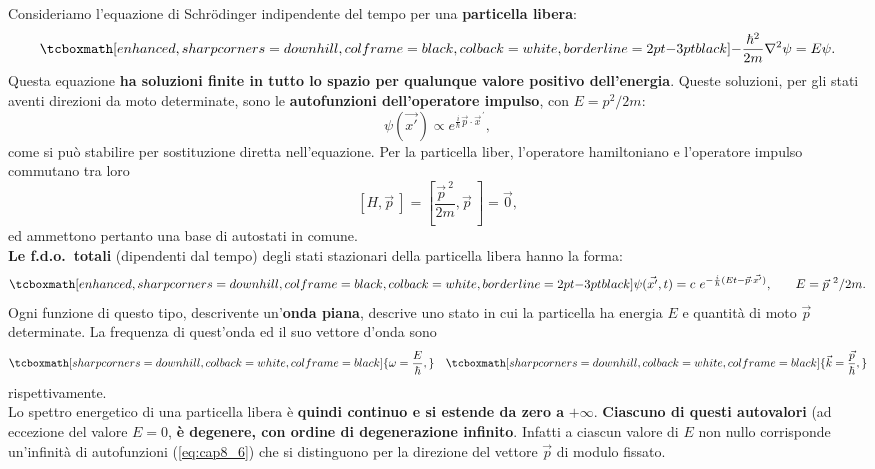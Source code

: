 Consideriamo l'equazione di Schr\"{o}dinger indipendente del tempo per una \textbf{particella libera}:
	\begin{equation}
		\tcboxmath[enhanced, sharp corners=downhill, colframe=black, colback=white, borderline={2pt}{-3pt}{black}]{
			-\frac{\hbar ^2}{2m}\nabla ^2 \psi = E\psi.
			}
	\end{equation}
Questa equazione \textbf{ha soluzioni finite in tutto lo spazio per qualunque valore positivo dell'energia}. Queste soluzioni, per gli stati aventi direzioni da moto determinate, sono le \textbf{autofunzioni dell'operatore impulso}, con $E= p^2/2m$:
	\begin{equation}
		\psi (\vec{x'}) \propto e ^{\frac{i}{\hbar}\vec{p}\cdot {\vec{x}}^{\, \prime}},
	\end{equation}
come si può stabilire per sostituzione diretta nell'equazione. Per la particella liber, l'operatore hamiltoniano e l'operatore impulso commutano tra loro
	\begin{equation}
		\left[ H, \vec{p}\ \right] = \left[ \frac{ {\vec{p}}^{\ 2}}{2m}, \vec{p}\ \right] =\vec{0},
	\end{equation}
ed ammettono pertanto una base di autostati in comune.\\
\textbf{Le f.d.o.~totali} (dipendenti dal tempo) degli stati stazionari della particella libera hanno la forma:
	\begin{equation}
		\tcboxmath[enhanced, sharp corners=downhill, colframe=black, colback=white, borderline={2pt}{-3pt}{black}]{
			\psi (\vec{x'}, t) = c\ e^{-\frac{i}{\hbar} (Et - \vec{p}\cdot \vec{x'})},} \qquad E={\vec{p}}^{\ 2}/{2m}.
	\label{eq:cap8_6}
	\end{equation}
Ogni funzione di questo tipo, descrivente un'\textbf{onda piana}, descrive uno stato in cui la particella ha energia $E$ e quantità di moto $\vec{p}$ determinate. La frequenza di quest'onda ed il suo vettore d'onda sono
	\begin{equation}
		\tcboxmath[sharp corners=downhill, colback=white, colframe=black]{
		\omega = \frac{E}{\hbar},
		} \quad 
	\tcboxmath[sharp corners=downhill, colback=white, colframe=black]{
		\vec{k}= \frac{\vec{p}}{\hbar},
		}
	\end{equation}
rispettivamente.\\

Lo spettro energetico di una particella libera è \textbf{quindi continuo e si estende da zero a} $+\infty$. \textbf{Ciascuno di questi autovalori} (ad eccezione del valore $E=0$, \textbf{è degenere, con ordine di degenerazione infinito}. Infatti a ciascun valore di $E$ non nullo corrisponde un'infinità di autofunzioni (\ref{eq:cap8_6}) che si distinguono per la direzione del vettore $\vec{p}$ di modulo fissato.
